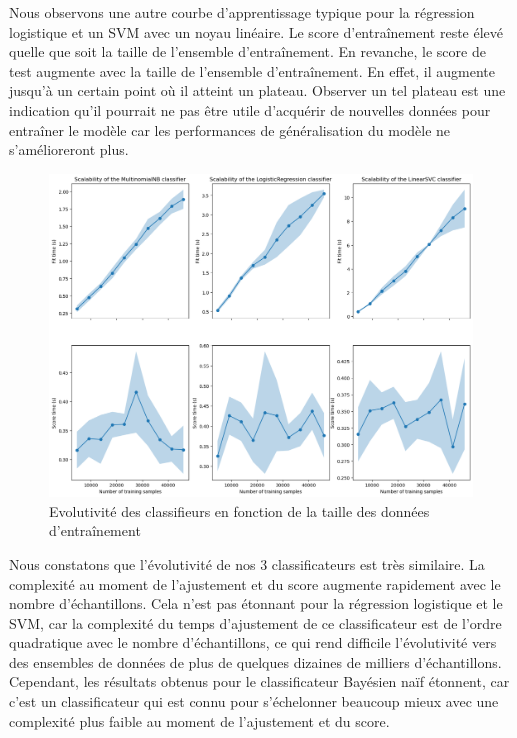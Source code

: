 \documentclass{article}
\begin{document}
Nous observons une autre courbe d'apprentissage typique pour la régression logistique et un SVM avec un noyau linéaire. Le score d'entraînement reste élevé quelle que soit la taille de l'ensemble d'entraînement. En revanche, le score de test augmente avec la taille de l'ensemble d'entraînement. En effet, il augmente jusqu'à un certain point où il atteint un plateau. Observer un tel plateau est une indication qu'il pourrait ne pas être utile d'acquérir de nouvelles données pour entraîner le modèle car les performances de généralisation du modèle ne s'amélioreront plus.

\begin{figure}[H]
    \centering
    \includegraphics[width=\textwidth]{./src/locuteur/complexity_analysis_nsamples.png} 
    \caption{Evolutivité des classifieurs en fonction de la taille des données d'entraînement}
    \label{complexity_analysis_nsamples_pres}
\end{figure}

Nous constatons que l'évolutivité de nos 3 classificateurs est très similaire. La complexité au moment de l'ajustement et du score augmente rapidement avec le nombre d'échantillons. Cela n'est pas étonnant pour la régression logistique et le SVM, car la complexité du temps d'ajustement de ce classificateur est de l'ordre quadratique avec le nombre d'échantillons, ce qui rend difficile l'évolutivité vers des ensembles de données de plus de quelques dizaines de milliers d'échantillons. Cependant, les résultats obtenus pour le classificateur Bayésien naïf étonnent, car c'est un classificateur qui est connu pour s'échelonner beaucoup mieux avec une complexité plus faible au moment de l'ajustement et du score. 
\end{document}
